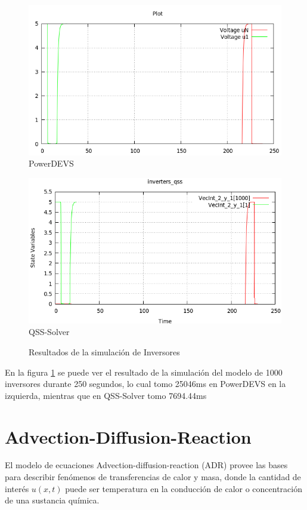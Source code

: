 \begin{figure}[H]
\centering
\begin{minipage}{0.5\textwidth}
 \includegraphics[width=\linewidth]{inversers-pd}
\centering
PowerDEVS
\end{minipage}\hfill
\begin{minipage}{0.5\textwidth}
 \includegraphics[width=\linewidth]{inversers-qss}
\centering
QSS-Solver
\end{minipage}
\caption{Resultados de la simulación de Inversores}
\label{graph:inverters}
\end{figure}

En la figura \ref{graph:inverters} se puede ver el resultado de la simulación del modelo de 1000 inversores durante 250 segundos, lo cual tomo 25046ms en PowerDEVS en 
	la izquierda, mientras que en QSS-Solver tomo 7694.44ms	

\section{Advection-Diffusion-Reaction}
	El modelo de ecuaciones Advection-diffusion-reaction (ADR) provee las bases para describir fenómenos de transferencias de calor y masa, donde la cantidad de interés $u(x,t)$ puede ser temperatura en la conducción de calor o concentración de una sustancia química.

